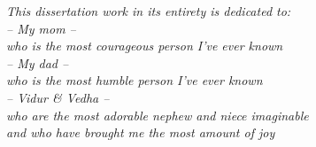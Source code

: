 \begin{center}
\vspace*{4.5cm}
\emph{This dissertation work in its entirety is dedicated to:\\ -- My mom -- \\ who is the most courageous person I've ever known\\ -- My dad -- \\ who is the most humble person I've ever known\\ -- Vidur \& Vedha -- \\ who are the most adorable nephew and niece imaginable\\ and who have brought me the most amount of joy}
\end{center}
